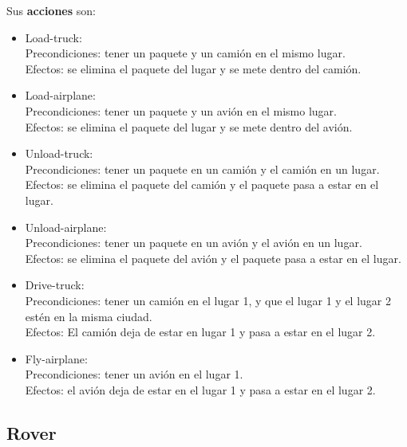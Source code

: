 \documentclass{uc3mpracticas}
\begin{document}
  Sus \textbf{acciones} son:
  \begin{itemize}
    \item Load-truck:
    \\Precondiciones: tener un paquete y un camión en el mismo lugar.
    \\Efectos: se elimina el paquete del lugar y se mete dentro del camión.
    \item Load-airplane:
    \\Precondiciones: tener un paquete y un avión en el mismo lugar.
    \\Efectos: se elimina el paquete del lugar y se mete dentro del avión.
    \item Unload-truck:
    \\Precondiciones: tener un paquete en un camión y el camión en un lugar.
    \\Efectos: se elimina el paquete del camión y el paquete pasa a estar en el lugar.
    \item Unload-airplane:
    \\Precondiciones: tener un paquete en un avión y el avión en un lugar.
    \\Efectos: se elimina el paquete del avión y el paquete pasa a estar en el lugar.
    \item Drive-truck:
    \\Precondiciones: tener un camión en el lugar 1, y que el lugar 1 y el lugar 2 estén en la misma ciudad.
    \\Efectos: El camión deja de estar en lugar 1 y pasa a estar en el lugar 2.
    \item Fly-airplane:
    \\Precondiciones: tener un avión en el lugar 1.
    \\Efectos: el avión deja de estar en el lugar 1 y pasa a estar en el lugar 2.
  \end{itemize}



  \subsection{Rover}
\end{document}
